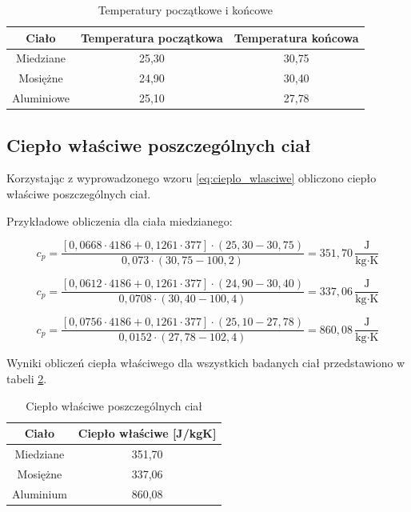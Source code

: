 \documentclass[a4paper,12pt]{article}
\begin{document}
\begin{table}[h]
    \centering
    \begin{tabular}{|c|c|c|}
        \hline
        \textbf{Ciało} & \textbf{Temperatura początkowa} & \textbf{Temperatura końcowa} \\
        \hline
        Miedziane & 25{,}30 & 30{,}75 \\
        \hline
        Mosiężne & 24{,}90 & 30{,}40 \\
        \hline
        Aluminiowe & 25{,}10 & 27{,}78 \\
        \hline
    \end{tabular}
    \caption{Temperatury początkowe i końcowe}
    \label{tab:temperatury}
\end{table}




\subsection{Ciepło właściwe poszczególnych ciał}

Korzystając z wyprowadzonego wzoru \ref{eq:cieplo_wlasciwe} obliczono ciepło właściwe poszczególnych ciał.

Przykładowe obliczenia dla ciała miedzianego:

\begin{equation*}
    c_p = \frac{[0{,}0668 \cdot 4186 + 0{,}1261 \cdot 377] \cdot (25{,}30 - 30{,}75)}{0{,}073 \cdot (30{,}75 - 100{,}2)} = 351{,}70\,\frac{\text{J}}{\text{kg} \cdot \text{K}}
\end{equation*}

\begin{equation*}
    c_p = \frac{[0{,}0612 \cdot 4186 + 0{,}1261 \cdot 377] \cdot (24{,}90 - 30{,}40)}{0{,}0708 \cdot (30{,}40 - 100{,}4)} = 337{,}06\,\frac{\text{J}}{\text{kg} \cdot \text{K}}
\end{equation*}

\begin{equation*}
    c_p = \frac{[0{,}0756 \cdot 4186 + 0{,}1261 \cdot 377] \cdot (25{,}10 - 27{,}78)}{0{,}0152 \cdot (27{,}78 - 102{,}4)} = 860{,}08\,\frac{\text{J}}{\text{kg} \cdot \text{K}}
\end{equation*}

Wyniki obliczeń ciepła właściwego dla wszystkich badanych ciał przedstawiono w tabeli \ref{tab:cieplo_wlasciwe}.

\begin{table}[H]
    \centering
    \begin{tabular}{|c|c|}
        \hline
        \textbf{Ciało} & \textbf{Ciepło właściwe [J/kgK]} \\
        \hline
        Miedziane & 351{,}70 \\
        \hline
        Mosiężne & 337{,}06 \\
        \hline
        Aluminium & 860{,}08 \\
        \hline
    \end{tabular}
    \caption{Ciepło właściwe poszczególnych ciał}
    \label{tab:cieplo_wlasciwe}
\end{table}
\end{document}
